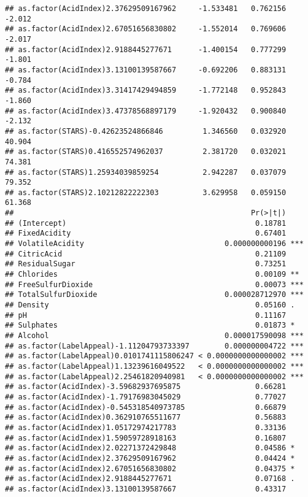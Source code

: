 \documentclass[
]{article}
\begin{document}
\begin{verbatim}
## as.factor(AcidIndex)2.37629509167962     -1.533481   0.762156  -2.012
## as.factor(AcidIndex)2.67051656830802     -1.552014   0.769606  -2.017
## as.factor(AcidIndex)2.9188445277671      -1.400154   0.777299  -1.801
## as.factor(AcidIndex)3.13100139587667     -0.692206   0.883131  -0.784
## as.factor(AcidIndex)3.31417429494859     -1.772148   0.952843  -1.860
## as.factor(AcidIndex)3.47378568897179     -1.920432   0.900840  -2.132
## as.factor(STARS)-0.42623524866846         1.346560   0.032920  40.904
## as.factor(STARS)0.416552574962037         2.381720   0.032021  74.381
## as.factor(STARS)1.25934039859254          2.942287   0.037079  79.352
## as.factor(STARS)2.10212822222303          3.629958   0.059150  61.368
##                                                      Pr(>|t|)    
## (Intercept)                                           0.18781    
## FixedAcidity                                          0.67401    
## VolatileAcidity                                0.000000000196 ***
## CitricAcid                                            0.21109    
## ResidualSugar                                         0.73251    
## Chlorides                                             0.00109 ** 
## FreeSulfurDioxide                                     0.00073 ***
## TotalSulfurDioxide                             0.000028712970 ***
## Density                                               0.05160 .  
## pH                                                    0.11167    
## Sulphates                                             0.01873 *  
## Alcohol                                        0.000017590098 ***
## as.factor(LabelAppeal)-1.11204793733397        0.000000004722 ***
## as.factor(LabelAppeal)0.0101741115806247 < 0.0000000000000002 ***
## as.factor(LabelAppeal)1.13239616049522   < 0.0000000000000002 ***
## as.factor(LabelAppeal)2.25461820940981   < 0.0000000000000002 ***
## as.factor(AcidIndex)-3.59682937695875                 0.66281    
## as.factor(AcidIndex)-1.79176983045029                 0.77027    
## as.factor(AcidIndex)-0.545318540973785                0.66879    
## as.factor(AcidIndex)0.362910765511677                 0.56883    
## as.factor(AcidIndex)1.05172974217783                  0.33136    
## as.factor(AcidIndex)1.59059728918163                  0.16807    
## as.factor(AcidIndex)2.02271372429848                  0.04586 *  
## as.factor(AcidIndex)2.37629509167962                  0.04424 *  
## as.factor(AcidIndex)2.67051656830802                  0.04375 *  
## as.factor(AcidIndex)2.9188445277671                   0.07168 .  
## as.factor(AcidIndex)3.13100139587667                  0.43317    

\end{verbatim}
\end{document}
